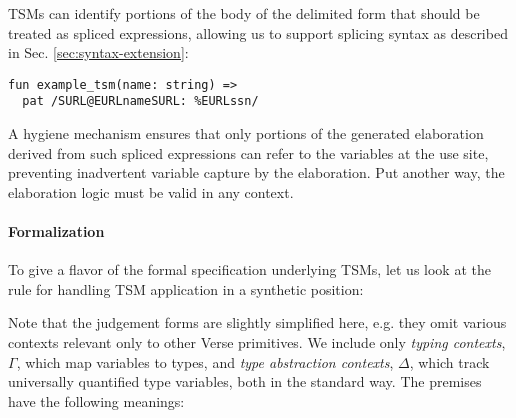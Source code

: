 TSMs can identify portions of the body of the delimited form that should be treated as spliced expressions, allowing us to support splicing syntax as described in Sec. \ref{sec:syntax-extension}:
\begin{lstlisting}[numbers=none]
fun example_tsm(name: string) => 
  pat /SURL@EURLnameSURL: %EURLssn/
\end{lstlisting}
A hygiene mechanism ensures that only portions of the generated elaboration derived from such spliced expressions can refer to the variables at the use site, preventing inadvertent variable capture by the elaboration. Put another way, the  elaboration logic must be valid in any context.

\paragraph{Formalization} To give a flavor of the formal specification underlying TSMs, let us look at the rule for handling TSM application in a synthetic position: 
\begin{mathpar}
\end{mathpar}
Note that the judgement forms are  slightly simplified here, e.g. they omit various contexts relevant only to other Verse primitives. We include only \emph{typing contexts}, $\Gamma$, which map variables to types, and \emph{type abstraction contexts}, $\Delta$, which track universally quantified type variables, both in the standard way. The premises have the following meanings:
